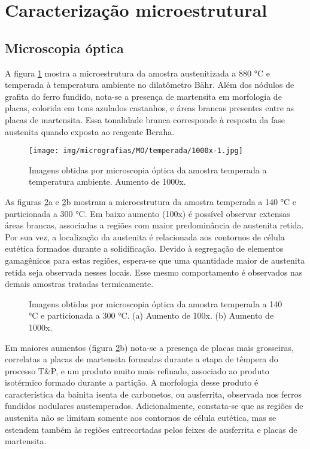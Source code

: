 \section{Caracteriza\c{c}\~{a}o microestrutural}

\label{sec:micros}

\subsection{Microscopia óptica}

A figura \ref{fig:temperada} mostra a microestrutura da amostra austenitizada a 880 °C e temperada à temperatura ambiente no dilatômetro Bähr. Além dos nódulos de grafita do ferro fundido, nota-se a presença de martensita em morfologia de placas, colorida em tons azulados castanhos, e áreas brancas presentes entre as placas de martensita. Essa tonalidade branca corresponde à resposta da fase austenita quando exposta ao reagente Beraha.

\begin{figure}
	\texttt{[image: img/micrografias/MO/temperada/1000x-1.jpg]}
	\caption{Imagens obtidas por microscopia óptica da amostra temperada a temperatura ambiente. Aumento de 1000x.}
	\label{fig:temperada}
\end{figure}

As figuras \ref{fig:TT140TP300}a e \ref{fig:TT140TP300}b mostram a microestrutura da amostra temperada a 140 °C e particionada a 300 °C. Em baixo aumento (100x) é possível observar extensas áreas brancas, associadas a regiões com maior predominância de austenita retida. Por sua vez, a localização da austenita é relacionada aos contornos de célula eutética formados durante a solidificação. Devido à segregação de elementos gamagênicos para estas regiões, espera-se que uma quantidade maior de austenita retida seja observada nesses locais. Esse mesmo comportamento é observados nas demais amostras tratadas termicamente.

\begin{figure}
	\vspace{0pt}
	\caption{Imagens obtidas por microscopia óptica da amostra temperada a 140 °C e particionada a 300 °C. (a) Aumento de 100x. (b) Aumento de 1000x.}
	\label{fig:TT140TP300}
\end{figure}

Em maiores aumentos (figura \ref{fig:TT140TP300}b) nota-se a presença de placas mais grosseiras, correlatas a placas de martensita formadas durante a etapa de têmpera do processo T\&P, e um produto muito mais refinado, associado ao produto isotérmico formado durante a partição. A morfologia desse produto é característica da bainita isenta de carbonetos, ou ausferrita, observada nos ferros fundidos nodulares austemperados. Adicionalmente, constata-se que as regiões de austenita não se limitam somente aos contornos de célula eutética, mas se estendem também às regiões entrecortadas pelos feixes de ausferrita e placas de martensita.

